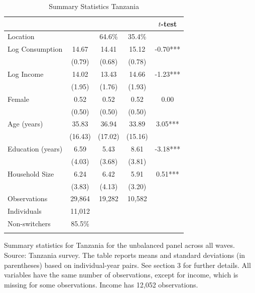 \begin{table}[htbp] \centering \caption{Summary Statistics Tanzania}\label{tab:summary_stats_TZA_unb_3waves} \begin{threeparttable} \begin{tabular}{l cccc} \toprule
 &  &  &  & $t$-test \\
\midrule
Location &  &   64.6\% &   35.4\% &  \\  \addlinespace \addlinespace
Log Consumption & 14.67 & 14.41 & 15.12 & -0.70*** \\
 & (0.79) & (0.68) & (0.78) &  \\  \addlinespace
Log Income & 14.02 & 13.43 & 14.66 & -1.23*** \\
 & (1.95) & (1.76) & (1.93) &  \\  \addlinespace
Female & 0.52 & 0.52 & 0.52 & 0.00 \\
 & (0.50) & (0.50) & (0.50) &  \\  \addlinespace
Age (years) & 35.83 & 36.94 & 33.89 & 3.05*** \\
 & (16.43) & (17.02) & (15.16) &  \\  \addlinespace
Education (years) & 6.59 & 5.43 & 8.61 & -3.18*** \\
 & (4.03) & (3.68) & (3.81) &  \\  \addlinespace
Household Size & 6.24 & 6.42 & 5.91 & 0.51*** \\
 & (3.83) & (4.13) & (3.20) &  \\  \addlinespace


\cmidrule{2-5}
Observations & 29,864 & 19,282 & 10,582 &  \\  \addlinespace
Individuals & 11,012 &  &  &  \\
Non-switchers &   85.5\% &  &  &  \\  \addlinespace
\bottomrule \end{tabular} \begin{tablenotes}[flushleft] \footnotesize \item{Summary statistics for Tanzania for the unbalanced panel across all waves. Source: Tanzania survey. The table reports means and standard deviations (in parentheses) based on individual-year pairs. See section 3 for further details. All variables have the same number of observations, except for income, which is missing for some observations. Income has 12,052 observations.} \end{tablenotes} \end{threeparttable} \end{table}